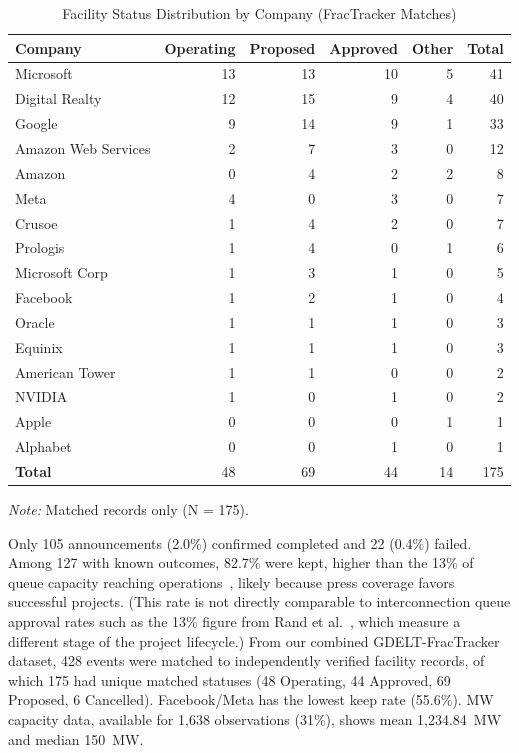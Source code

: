 \documentclass[5p,12pt]{elsarticle}
\begin{document}
\begin{table}[t]
\centering
\caption{Facility Status Distribution by Company (FracTracker Matches)}
\label{tab:label_distribution}
\footnotesize
\begin{tabular}{lrrrrr}
\toprule
\textbf{Company} & \textbf{Operating} & \textbf{Proposed} & \textbf{Approved} & \textbf{Other} & \textbf{Total} \\
\midrule
Microsoft & 13 & 13 & 10 & 5 & 41 \\
Digital Realty & 12 & 15 & 9 & 4 & 40 \\
Google & 9 & 14 & 9 & 1 & 33 \\
Amazon Web Services & 2 & 7 & 3 & 0 & 12 \\
Amazon & 0 & 4 & 2 & 2 & 8 \\
Meta & 4 & 0 & 3 & 0 & 7 \\
Crusoe & 1 & 4 & 2 & 0 & 7 \\
Prologis & 1 & 4 & 0 & 1 & 6 \\
Microsoft Corp & 1 & 3 & 1 & 0 & 5 \\
Facebook & 1 & 2 & 1 & 0 & 4 \\
Oracle & 1 & 1 & 1 & 0 & 3 \\
Equinix & 1 & 1 & 1 & 0 & 3 \\
American Tower & 1 & 1 & 0 & 0 & 2 \\
NVIDIA & 1 & 0 & 1 & 0 & 2 \\
Apple & 0 & 0 & 0 & 1 & 1 \\
Alphabet & 0 & 0 & 1 & 0 & 1 \\
\midrule
\textbf{Total} & 48 & 69 & 44 & 14 & 175 \\
\bottomrule
\end{tabular}
\footnotesize \textit{Note:} Matched records only (N = 175).
\end{table}

Only 105 announcements (2.0\%) confirmed completed and 22 (0.4\%) failed. Among 127 with known outcomes, 82.7\% were kept, higher than the 13\% of queue capacity reaching operations~\cite{Rand2025QueuedUp}, likely because press coverage favors successful projects. (This rate is not directly comparable to interconnection queue approval rates such as the 13\% figure from Rand et al.~\cite{Rand2025QueuedUp}, which measure a different stage of the project lifecycle.) From our combined GDELT-FracTracker dataset, 428 events were matched to independently verified facility records, of which 175 had unique matched statuses (48 Operating, 44 Approved, 69 Proposed, 6 Cancelled). Facebook/Meta has the lowest keep rate (55.6\%). MW capacity data, available for 1,638 observations (31\%), shows mean 1,234.84~MW and median 150~MW.
\end{document}
